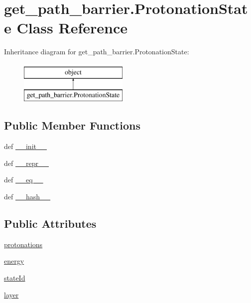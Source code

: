 \hypertarget{classget__path__barrier_1_1_protonation_state}{\section{get\-\_\-path\-\_\-barrier.\-Protonation\-State Class Reference}
\label{classget__path__barrier_1_1_protonation_state}
}
Inheritance diagram for get\-\_\-path\-\_\-barrier.\-Protonation\-State\-:\begin{figure}[H]
\begin{center}
\leavevmode
\includegraphics[height=2.000000cm]{classget__path__barrier_1_1_protonation_state}
\end{center}
\end{figure}
\subsection*{Public Member Functions}
\begin{DoxyCompactItemize}
\item 
def \hyperlink{classget__path__barrier_1_1_protonation_state_a5e56262319e3d5d2a72aa81aa0955bc9}{\-\_\-\-\_\-init\-\_\-\-\_\-}
\item 
def \hyperlink{classget__path__barrier_1_1_protonation_state_af592e055063b5b7f253725fbabe0c7ee}{\-\_\-\-\_\-repr\-\_\-\-\_\-}
\item 
def \hyperlink{classget__path__barrier_1_1_protonation_state_a37bf6b1faf41f3e5a7885153479cfc7a}{\-\_\-\-\_\-eq\-\_\-\-\_\-}
\item 
def \hyperlink{classget__path__barrier_1_1_protonation_state_ae47205464189ac09427afaafa2d490d0}{\-\_\-\-\_\-hash\-\_\-\-\_\-}
\end{DoxyCompactItemize}
\subsection*{Public Attributes}
\begin{DoxyCompactItemize}
\item 
\hyperlink{classget__path__barrier_1_1_protonation_state_ab17df337fcf1611aae2ca3d32c7d9925}{protonations}
\item 
\hyperlink{classget__path__barrier_1_1_protonation_state_a26b22fd31a45e001adadace05453862c}{energy}
\item 
\hyperlink{classget__path__barrier_1_1_protonation_state_a0887568cf1ad7ef61b03b9e9e0438186}{state\-Id}
\item 
\hyperlink{classget__path__barrier_1_1_protonation_state_afa1e7d9c2e2721bb0eaacaff5729e68f}{layer}
\end{DoxyCompactItemize}
